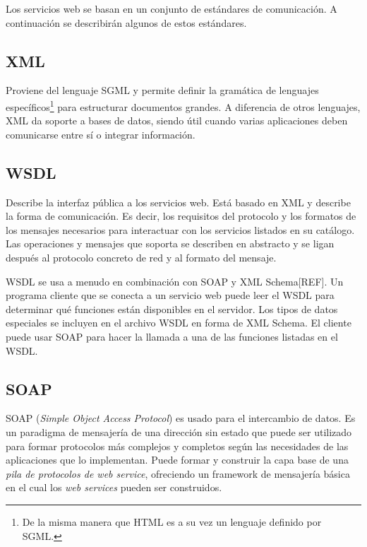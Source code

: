 \documentclass[conference]{IEEEtran}
\begin{document}
Los servicios web se basan en un conjunto de estándares de
comunicación. A continuación se describirán algunos de estos
estándares. 

\subsection{XML}
\label{sec:serv-soa-xml}

Proviene del lenguaje SGML y permite definir la gramática de lenguajes
específicos\footnote{De la misma manera que HTML es a su vez un lenguaje
definido por SGML.} para estructurar documentos grandes. A diferencia
de otros lenguajes, XML da soporte a bases de datos, siendo útil
cuando varias aplicaciones deben comunicarse entre sí o integrar
información.

\subsection{WSDL}
\label{sec:serv-soa-wsdl}

Describe la interfaz pública a los servicios web. Está basado en XML y
describe la forma de comunicación. Es decir, los requisitos del
protocolo y los formatos de los mensajes necesarios para interactuar
con los servicios listados en su catálogo. Las operaciones y mensajes
que soporta se describen en abstracto y se ligan después al protocolo
concreto de red y al formato del mensaje.

WSDL se usa a menudo en combinación con SOAP y XML Schema[REF]. Un programa
cliente que se conecta a un servicio web puede leer el WSDL para
determinar qué funciones están disponibles en el servidor. Los tipos
de datos especiales se incluyen en el archivo WSDL en forma de XML
Schema. El cliente puede usar SOAP para hacer la llamada a una de las
funciones listadas en el WSDL.

\subsection{SOAP}
\label{sec:serv-soa-soap}

SOAP (\textsl{Simple Object Access Protocol}) es usado para el
intercambio de datos.
Es un paradigma de mensajería de una dirección sin estado que puede
ser utilizado para formar protocolos más complejos y completos según
las necesidades de las aplicaciones que lo implementan. Puede formar y
construir la capa base de una \emph{pila de protocolos de web service},
ofreciendo un framework de mensajería básica en el cual los \emph{web
services} pueden ser construidos.
\end{document}
